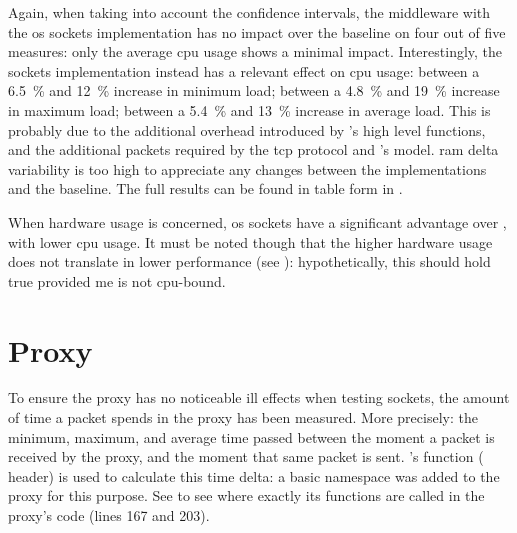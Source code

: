 Again, when taking into account the confidence intervals, the \gls{middleware} with the \gls{os} sockets implementation has no impact over the baseline on four out of five measures: only the average \gls{cpu} usage shows a minimal impact. Interestingly, the  sockets implementation instead has a relevant effect on \gls{cpu} usage: between a \SI{6,5}{\percent} and \SI{12}{\percent} increase in minimum load; between a \SI{4,8}{\percent} and \SI{19}{\percent} increase in maximum load; between a \SI{5,4}{\percent} and \SI{13}{\percent} increase in average load. This is probably due to the additional overhead introduced by 's high level functions, and the additional \glspl{packet} required by the \gls{tcp} protocol and 's  model. \gls{ram} delta variability is too high to appreciate any changes between the implementations and the baseline.  The full results can be found in table form in .

When hardware usage is concerned, \gls{os} sockets have a significant advantage over , with lower \gls{cpu} usage. It must be noted though that the higher hardware usage does not translate in lower performance (see ): hypothetically, this should hold true provided \gls{me} is not \gls{cpu}-bound.

\section{Proxy}\label{sc:performance:proxy}



To ensure the \gls{proxy} has no noticeable ill effects when testing  sockets, the amount of time a \gls{packet} spends in the \gls{proxy} has been measured. More precisely: the minimum, maximum, and average time passed between the moment a \gls{packet} is received by the \gls{proxy}, and the moment that same \gls{packet} is sent. 's  function ( header) is used to calculate this time delta: a basic  namespace was added to the proxy for this purpose. See  to see where exactly its functions are called in the \gls{proxy}'s code (lines \num{167} and \num{203}).

